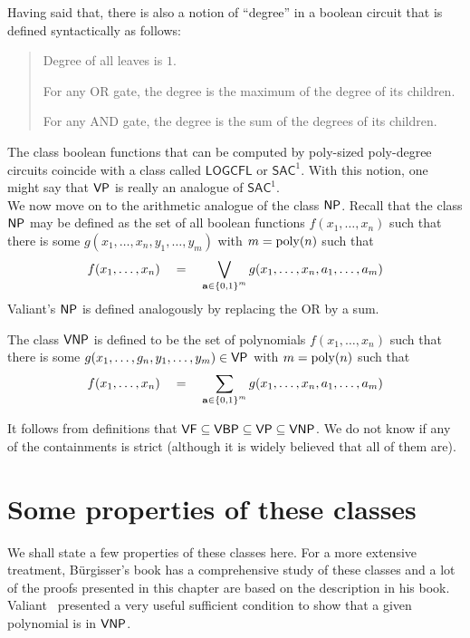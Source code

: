 Having said that, there is also a notion of ``degree'' in a boolean circuit that is defined syntactically as follows:
 \begin{quote}
   Degree of all leaves is $1$. 

   For any OR gate, the degree is the maximum of the degree of its children. 

   For any AND gate, the degree is the sum of the degrees of its children. 
 \end{quote}
The class boolean functions that can be computed by poly-sized poly-degree circuits coincide with a class called $\mathsf{LOGCFL}$ or $\mathsf{SAC}^1$. With this notion, one might say that $\mathsf{VP}$ is really an analogue of $\mathsf{SAC}^1$.\\


We now move on to the arithmetic analogue of the class $\NP$. Recall that the class $\NP$ may be defined as the set of all boolean functions $f(x_1,\dots, x_n)$ such that there is some $g(x_1,\dots, x_n, y_1,\dots, y_m)$ with $m = \mathrm{poly}(n)$ such that 
\[
f(x_1,\dots, x_n)\quad = \quad \bigvee_{\mathbf{a} \in \left\{0,1\right\}^m}  g(x_1,\dots, x_n, a_1,\dots, a_m)
\]
Valiant's $\NP$ is defined analogously by replacing the OR by a sum. 

\begin{definition}[Valiant's $\NP$]\label{defn:vnp}
The class $\mathsf{VNP}$ is defined to be the set of polynomials $f(x_1,\dots, x_n)$ such that there is some $g(x_1,\dots, g_n, y_1,\dots, y_m) \in \mathsf{VP}$ with $m = \mathrm{poly}(n)$ such that 
\[
f(x_1,\dots, x_n)\quad = \quad \sum_{\mathbf{a} \in \left\{0,1\right\}^m}  g(x_1,\dots, x_n, a_1,\dots, a_m)
\]
\end{definition}

It follows from definitions that $\mathsf{VF} \subseteq \mathsf{VBP} \subseteq \mathsf{VP} \subseteq \mathsf{VNP}$. We do not know if any of the containments is strict (although it is widely believed that all of them are). 

\section{Some properties of these classes}

We shall state a few properties of these classes here. For a more extensive treatment, B\"{u}rgisser's book \cite{bur00} has a comprehensive study of these classes and a lot of the proofs presented in this chapter are based on the description in his book. \\

Valiant~\cite{v79} presented a very useful sufficient condition to show that a given polynomial is in $\mathsf{VNP}$. 

